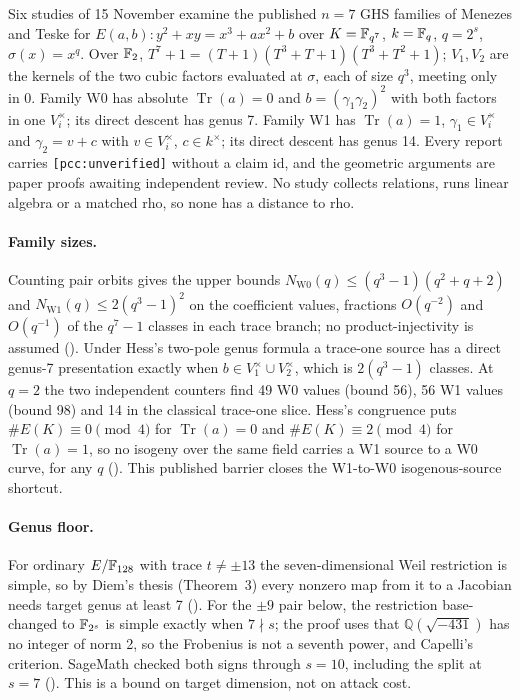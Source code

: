 Six studies of 15 November examine the published $n=7$ GHS families of
Menezes and Teske for $E(a,b)\colon y^2+xy=x^3+ax^2+b$ over
$K=\mathbb{F}_{q^7}$, $k=\mathbb{F}_q$, $q=2^s$, $\sigma(x)=x^q$. Over $\mathbb{F}_2$,
$T^7+1=(T+1)(T^3+T+1)(T^3+T^2+1)$; $V_1,V_2$ are the kernels of the two cubic
factors evaluated at $\sigma$, each of size $q^3$, meeting only in 0. Family
W0 has absolute $\operatorname{Tr}(a)=0$ and $b=(\gamma_1\gamma_2)^2$ with
both factors in one $V_i^\times$; its direct descent has genus 7. Family W1
has $\operatorname{Tr}(a)=1$, $\gamma_1\in V_i^\times$ and $\gamma_2=v+c$ with
$v\in V_i^\times$, $c\in k^\times$; its direct descent has genus 14. Every
report carries \texttt{[pcc:unverified]} without a claim id, and the
geometric arguments are paper proofs awaiting independent review. No study
collects relations, runs linear algebra or a matched rho, so none has a
distance to rho.

\paragraph{Family sizes.} Counting pair orbits gives the upper bounds
$N_{\mathrm{W0}}(q)\le(q^3-1)(q^2+q+2)$ and $N_{\mathrm{W1}}(q)\le2(q^3-1)^2$
on the coefficient values, fractions $O(q^{-2})$ and $O(q^{-1})$ of the
$q^7-1$ classes in each trace branch; no product-injectivity is assumed
(). Under Hess's
two-pole genus formula a trace-one source has a direct genus-7 presentation
exactly when $b\in V_1^\times\cup V_2^\times$, which is $2(q^3-1)$ classes.
At $q=2$ the two independent counters find 49 W0 values (bound 56), 56 W1
values (bound 98) and 14 in the classical trace-one slice. Hess's congruence
puts $\#E(K)\equiv0\pmod4$ for $\operatorname{Tr}(a)=0$ and
$\#E(K)\equiv2\pmod4$ for $\operatorname{Tr}(a)=1$, so no isogeny over the
same field carries a W1 source to a W0 curve, for any $q$
(). This published
barrier closes the W1-to-W0 isogenous-source shortcut.

\paragraph{Genus floor.} For ordinary $E/\mathbb{F}_{128}$ with trace
$t\ne\pm13$ the seven-dimensional Weil restriction is simple, so by Diem's
thesis (Theorem~3) every nonzero map from it to a Jacobian needs target genus
at least 7 (). For the
$\pm9$ pair below, the restriction base-changed to $\mathbb{F}_{2^s}$ is simple
exactly when $7\nmid s$; the proof uses that $\mathbb{Q}(\sqrt{-431})$ has no
integer of norm 2, so the Frobenius is not a seventh power, and Capelli's
criterion. SageMath checked both signs through $s=10$, including the split
at $s=7$ (). This
is a bound on target dimension, not on attack cost.

